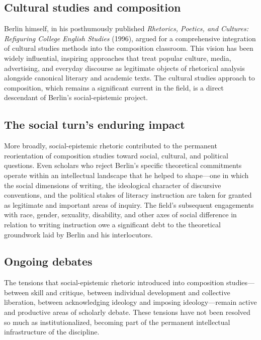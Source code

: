 \documentclass[12pt]{article}
\begin{document}
\subsection*{Cultural studies and composition}

Berlin himself, in his posthumously published \textit{Rhetorics, Poetics, and Cultures: Refiguring College English Studies} (1996), argued for a comprehensive integration of cultural studies methods into the composition classroom. This vision has been widely influential, inspiring approaches that treat popular culture, media, advertising, and everyday discourse as legitimate objects of rhetorical analysis alongside canonical literary and academic texts. The cultural studies approach to composition, which remains a significant current in the field, is a direct descendant of Berlin's social-epistemic project.

\subsection*{The social turn's enduring impact}

More broadly, social-epistemic rhetoric contributed to the permanent reorientation of composition studies toward social, cultural, and political questions. Even scholars who reject Berlin's specific theoretical commitments operate within an intellectual landscape that he helped to shape---one in which the social dimensions of writing, the ideological character of discursive conventions, and the political stakes of literacy instruction are taken for granted as legitimate and important areas of inquiry. The field's subsequent engagements with race, gender, sexuality, disability, and other axes of social difference in relation to writing instruction owe a significant debt to the theoretical groundwork laid by Berlin and his interlocutors.

\subsection*{Ongoing debates}

The tensions that social-epistemic rhetoric introduced into composition studies---between skill and critique, between individual development and collective liberation, between acknowledging ideology and imposing ideology---remain active and productive areas of scholarly debate. These tensions have not been resolved so much as institutionalized, becoming part of the permanent intellectual infrastructure of the discipline.
\end{document}
